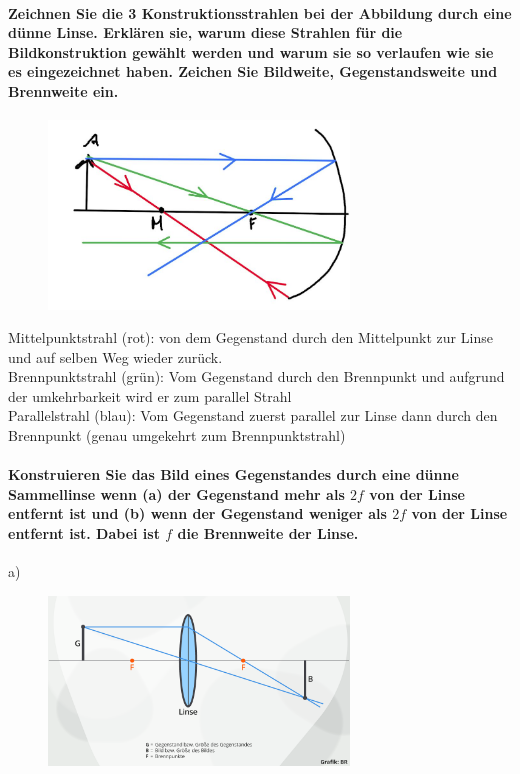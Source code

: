 \documentclass[a4paper, 11pt, parskip=half]{scrartcl}
\begin{document}
\paragraph{Zeichnen Sie die 3 Konstruktionsstrahlen bei der Abbildung durch eine dünne Linse.
Erklären sie, warum diese Strahlen für die Bildkonstruktion gewählt werden und warum sie so
verlaufen wie sie es eingezeichnet haben. Zeichen Sie Bildweite, Gegenstandsweite und Brennweite
ein.}

\begin{figure}[H]
    \centering
    \includegraphics[width=8cm]{image/17/geo14}
\end{figure}



Mittelpunktstrahl (rot): von dem Gegenstand durch den Mittelpunkt zur Linse und auf selben Weg wieder zurück.\\
Brennpunktstrahl (grün): Vom Gegenstand durch den Brennpunkt und aufgrund der umkehrbarkeit wird er zum parallel Strahl\\
Parallelstrahl (blau): Vom Gegenstand zuerst parallel zur Linse dann durch den Brennpunkt (genau umgekehrt zum Brennpunktstrahl)

\paragraph{Konstruieren Sie das Bild eines Gegenstandes durch eine dünne Sammellinse wenn (a) der
Gegenstand mehr als $2f$ von der Linse entfernt ist und (b) wenn der Gegenstand weniger als $2f$ von
der Linse entfernt ist. Dabei ist $f$ die Brennweite der Linse.}

a)
\begin{figure}[H]
    \centering
    \includegraphics[width=8cm]{image/17/geo15a}
\end{figure}
\end{document}
